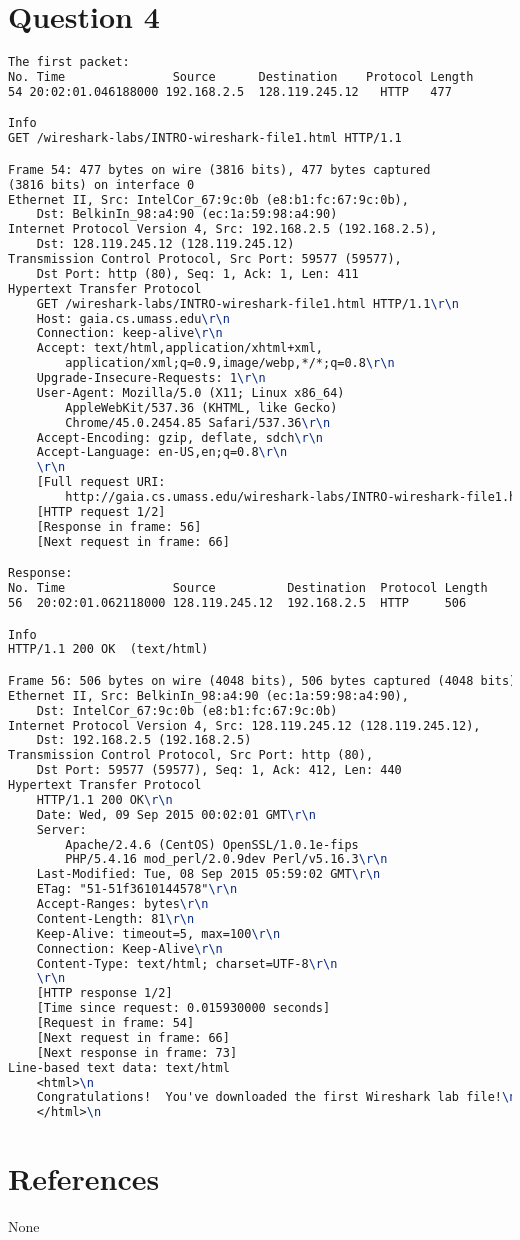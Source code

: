 \documentclass[11pt]{article}
\theoremstyle{definition}
\begin{document}
\section*{Question 4}
\begin{lstlisting}[language=TeX]
The first packet:
No. Time               Source      Destination    Protocol Length
54 20:02:01.046188000 192.168.2.5  128.119.245.12   HTTP   477    

Info
GET /wireshark-labs/INTRO-wireshark-file1.html HTTP/1.1 

Frame 54: 477 bytes on wire (3816 bits), 477 bytes captured 
(3816 bits) on interface 0
Ethernet II, Src: IntelCor_67:9c:0b (e8:b1:fc:67:9c:0b), 
	Dst: BelkinIn_98:a4:90 (ec:1a:59:98:a4:90)
Internet Protocol Version 4, Src: 192.168.2.5 (192.168.2.5), 
	Dst: 128.119.245.12 (128.119.245.12)
Transmission Control Protocol, Src Port: 59577 (59577), 
	Dst Port: http (80), Seq: 1, Ack: 1, Len: 411
Hypertext Transfer Protocol
    GET /wireshark-labs/INTRO-wireshark-file1.html HTTP/1.1\r\n
    Host: gaia.cs.umass.edu\r\n
    Connection: keep-alive\r\n
    Accept: text/html,application/xhtml+xml,
    	application/xml;q=0.9,image/webp,*/*;q=0.8\r\n
    Upgrade-Insecure-Requests: 1\r\n
    User-Agent: Mozilla/5.0 (X11; Linux x86_64) 
    	AppleWebKit/537.36 (KHTML, like Gecko) 
    	Chrome/45.0.2454.85 Safari/537.36\r\n
    Accept-Encoding: gzip, deflate, sdch\r\n
    Accept-Language: en-US,en;q=0.8\r\n
    \r\n
    [Full request URI: 
    	http://gaia.cs.umass.edu/wireshark-labs/INTRO-wireshark-file1.html]
    [HTTP request 1/2]
    [Response in frame: 56]
    [Next request in frame: 66]

Response:
No. Time               Source          Destination  Protocol Length
56  20:02:01.062118000 128.119.245.12  192.168.2.5  HTTP     506    

Info
HTTP/1.1 200 OK  (text/html)

Frame 56: 506 bytes on wire (4048 bits), 506 bytes captured (4048 bits) on interface 0
Ethernet II, Src: BelkinIn_98:a4:90 (ec:1a:59:98:a4:90),
	Dst: IntelCor_67:9c:0b (e8:b1:fc:67:9c:0b)
Internet Protocol Version 4, Src: 128.119.245.12 (128.119.245.12),
	Dst: 192.168.2.5 (192.168.2.5)
Transmission Control Protocol, Src Port: http (80),
	Dst Port: 59577 (59577), Seq: 1, Ack: 412, Len: 440
Hypertext Transfer Protocol
    HTTP/1.1 200 OK\r\n
    Date: Wed, 09 Sep 2015 00:02:01 GMT\r\n
    Server:
    	Apache/2.4.6 (CentOS) OpenSSL/1.0.1e-fips 
    	PHP/5.4.16 mod_perl/2.0.9dev Perl/v5.16.3\r\n
    Last-Modified: Tue, 08 Sep 2015 05:59:02 GMT\r\n
    ETag: "51-51f3610144578"\r\n
    Accept-Ranges: bytes\r\n
    Content-Length: 81\r\n
    Keep-Alive: timeout=5, max=100\r\n
    Connection: Keep-Alive\r\n
    Content-Type: text/html; charset=UTF-8\r\n
    \r\n
    [HTTP response 1/2]
    [Time since request: 0.015930000 seconds]
    [Request in frame: 54]
    [Next request in frame: 66]
    [Next response in frame: 73]
Line-based text data: text/html
    <html>\n
    Congratulations!  You've downloaded the first Wireshark lab file!\n
    </html>\n
\end{lstlisting}


\noindent\hrulefill


\section*{References}

None
\end{document}
